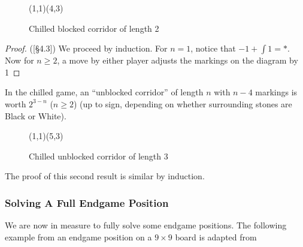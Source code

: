 \documentclass[../math194_paper.tex]{subfiles}
\begin{document}
\begin{figure}[H]
    \centering
    \begin{psgopartialboard*}{(1,1)(4,3)}
        
    \end{psgopartialboard*}
    \caption{Chilled blocked corridor of length 2}
    \label{fig:my_label}
\end{figure}
\begin{proof}(\cite{berlekamp1991introductory}[\S 4.3]) 
We proceed by induction. For $n=1$, notice that $-1 + \int 1 = *$. \\
Now for $n \geq 2$, a move by either player adjusts the markings on the diagram by 1

\end{proof}

\begin{theorem}
    \label{unblocked_corridor}
    In the chilled game, an ``unblocked corridor'' of length $n$ with $n-4$ markings is worth $2^{3-n}$ ($n\geq2$)
    (up to sign, depending on whether surrounding stones are Black or White).
\end{theorem}

\begin{figure}[H]
    \centering
    \begin{psgopartialboard*}{(1,1)(5,3)}
        
    \end{psgopartialboard*}
    \caption{Chilled unblocked corridor of length 3}
\end{figure}
The proof of this second result is similar by induction.

\subsubsection{Solving A Full Endgame Position}
We are now in measure to fully solve some endgame positions. The following 
example from an endgame position on a $9\times9$ board 
is adapted from \cite[\S 2]{berlekamp1994mathematical}
\end{document}
